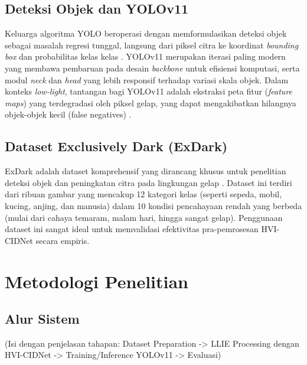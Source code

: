 \documentclass[conference]{IEEEtran}
\begin{document}
\subsection{Deteksi Objek dan YOLOv11}
Keluarga algoritma YOLO beroperasi dengan memformulasikan deteksi objek sebagai masalah regresi tunggal, langsung dari piksel citra ke koordinat \textit{bounding box} dan probabilitas kelas kelas \cite{yolo_review}. YOLOv11 merupakan iterasi paling modern yang membawa pembaruan pada desain \textit{backbone} untuk efisiensi komputasi, serta modul \textit{neck} dan \textit{head} yang lebih responsif terhadap variasi skala objek. Dalam konteks \textit{low-light}, tantangan bagi YOLOv11 adalah ekstraksi peta fitur (\textit{feature maps}) yang terdegradasi oleh piksel gelap, yang dapat mengakibatkan hilangnya objek-objek kecil (false negatives) \cite{yolo_lowlight}.

\subsection{Dataset Exclusively Dark (ExDark)}
ExDark adalah dataset komprehensif yang dirancang khusus untuk penelitian deteksi objek dan peningkatan citra pada lingkungan gelap \cite{exdark}. Dataset ini terdiri dari ribuan gambar yang mencakup 12 kategori kelas (seperti sepeda, mobil, kucing, anjing, dan manusia) dalam 10 kondisi pencahayaan rendah yang berbeda (mulai dari cahaya temaram, malam hari, hingga sangat gelap). Penggunaan dataset ini sangat ideal untuk memvalidasi efektivitas pra-pemrosesan HVI-CIDNet secara empiris.


\section{Metodologi Penelitian}

\subsection{Alur Sistem}
(Isi dengan penjelasan tahapan: Dataset Preparation -> LLIE Processing dengan HVI-CIDNet -> Training/Inference YOLOv11 -> Evaluasi)
\end{document}
